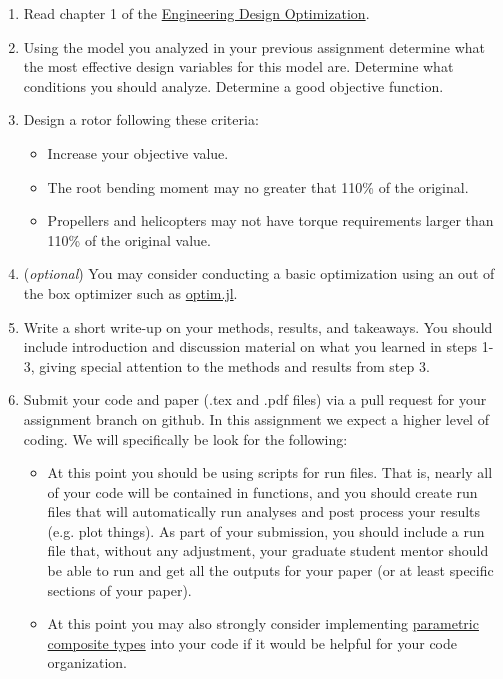 \documentclass[12pt]{article}
\begin{document}
\begin{enumerate}
	\item Read chapter 1 of the \href{http://flowlab.groups.et.byu.net/mdobook.pdf}{Engineering Design Optimization}. 
	\item Using the model you analyzed in your previous assignment determine what the most effective design variables for this model are. Determine what conditions you should analyze. Determine a good objective function.
	\item Design a rotor following these criteria: 
	\begin{itemize}
		\item Increase your objective value.
		\item The root bending moment may no greater that 110\% of the original. 
		\item Propellers and helicopters may not have torque requirements larger than 110\% of the original value. 
	\end{itemize}
	\item[] (\textit{optional}) You may consider conducting a basic optimization using an out of the box optimizer such as \href{https://github.com/JuliaNLSolvers/Optim.jl}{optim.jl}. 
	\item Write a short write-up on your methods, results, and takeaways. You should include introduction and discussion material on what you learned in steps 1-3, giving special attention to the methods and results from step 3. 
	\item Submit your code and paper (.tex and .pdf files) via a pull request for your assignment branch on github. In this assignment we expect a higher level of coding. We will specifically be look for the following: 
	\begin{itemize}
		\item At this point you should be using scripts for run files.  That is, nearly all of your code will be contained in functions, and you should create run files that will automatically run analyses and post process your results (e.g. plot things).  As part of your submission, you should include a run file that, without any adjustment, your graduate student mentor should be able to run and get all the outputs for your paper (or at least specific sections of your paper).
		\item At this point you may also strongly consider implementing \href{https://docs.julialang.org/en/v1/manual/types/#Composite-Types}{parametric composite types} into your code if it would be helpful for your code organization. 
	\end{itemize}
\end{enumerate}
\end{document}
